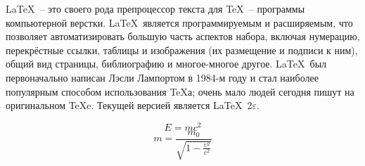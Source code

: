 \documentclass[a4paper, 12pt]{article} %
\begin{document}
\LaTeX \  -- это своего рода препроцессор текста для \TeX \ -- программы компьютерной верстки. \LaTeX \ является программируемым и расширяемым, что позволяет автоматизировать большую часть аспектов набора, включая нумерацию, перекрёстные ссылки, таблицы и изображения (их размещение и подписи к ним), общий вид страницы, библиографию и многое-многое другое. \LaTeX \ был первоначально написан Лэсли Лампортом в 1984-м году и стал наиболее популярным способом использования \TeX а; очень мало людей сегодня пишут на оригинальном \TeX e. Текущей версией является \LaTeX \ 2$\varepsilon$.

\begin{displaymath}
    E = mc^2
\end{displaymath}
\begin{displaymath}
    m = \frac{m_{0}}{\sqrt{1 - \frac{\upsilon^2}{c^2}}}
\end{displaymath}
\end{document}
